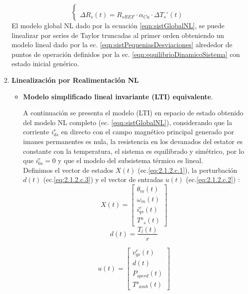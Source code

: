 \documentclass[10pt]{article}
\begin{document}
\begin{enumerate}
\begin{equation}
\begin{cases}
			\\
			\\
			\Delta R_{s}( t )=R_{sREF}\cdot\alpha_{Cu}\cdot {\Delta T_{s}}^{\circ}( t )
		\end{cases}
	\end{equation}
	El modelo global NL dado por la ecuación \ref{eqn:sistGlobalNL}, se puede linealizar por series de Taylor truncadas al primer orden obteniendo 
	un modelo lineal dado por la ec. \ref{eqn:sistPequeniasDesviaciones} alrededor de puntos de operación definidos por la ec. \ref{eqn:equilibrioDinamicoSistema} con estado inicial genérico.

    \item \textbf{Linealización por Realimentación NL}
    \begin{itemize}
    
	\item\textbf{ Modelo simplificado lineal invariante (LTI) equivalente}.
	
	A continuación se presenta el modelo (LTI) en espacio de estado obtenido del modelo NL completo (ec. \ref{eqn:sistGlobalNL}), considerando que la corriente $i^{r}_{ds}$ en directo con el campo magnético principal generado por imanes permanentes es nula, la resistencia en los devanados del estator es constante con la temperatura, el sistema es equilibrado y simétrico, por lo que $i^{r}_{0s}=0$ y que el modelo del subsistema térmico es lineal.\\
	Definimos el vector de estados $X(t)$ (ec.\ref{eq:2.1.2.c.1}), la perturbación $d(t)$ (ec.\ref{eq:2.1.2.c.3}) y el vector de entradas $u(t)$ (ec.\ref{eq:2.1.2.c.2}) :
	\begin{equation}
		X(t)=\begin{bmatrix}
			\theta_{m}(t)\\
			\omega_{m}(t) 
			\\ 
			i^{r}_{qs}(t)\\
			T°_{s}(t)
		\end{bmatrix}
		\label{eq:2.1.2.c.1}
	\end{equation}
		\begin{equation}
		d(t)=\frac{T_{l}(t)}{r} 
		\label{eq:2.1.2.c.3}
	\end{equation}
	
	\begin{equation}
		u(t)=\begin{bmatrix}
			v^{r}_{qs} (t)\\
			d(t)\\
			P_{s perd}(t)\\
			T°_{amb}(t) 
		\end{bmatrix}
		\label{eq:2.1.2.c.2}
	\end{equation}


\end{itemize}
\end{enumerate}
\end{document}
